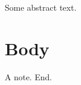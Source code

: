 \documentclass{article}
\begin{document}
Some abstract text.
\section{Body}
A note.
{}
End.
\end{document}
